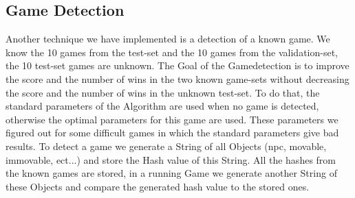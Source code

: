  
  
\subsection{Game Detection} 
  
Another technique we have implemented is a detection of a known game. We know the 10 games from the test-set and the 10 games from the validation-set, the 10 test-set games are unknown. The Goal of the Gamedetection is to improve the score and the number of wins in the two known game-sets without decreasing the score and the number of wins in the unknown test-set. To do that, the standard parameters of the Algorithm are used when no game is detected, otherwise the optimal parameters for this game are used. These parameters we figured out for some difficult games in which the standard parameters give bad results. To detect a game we generate a String of all Objects (npc, movable, immovable, ect...) and store the Hash value of this String. All the hashes from the known games are stored, in a running Game we generate another String of these Objects and compare the generated hash value to the stored ones. 